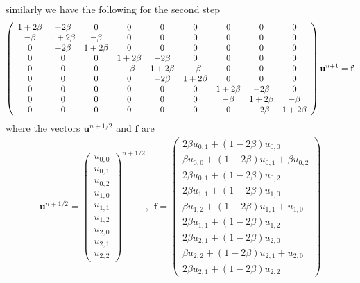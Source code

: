 similarly we have the following for the second step
\begin{align}
  \left(\begin{array}{c c c c c c c c c}
        1+2\beta & -2\beta &0 &0 &0 &0 &0 &0 &0\\
        -\beta & 1+2\beta & -\beta &0 &0 &0 &0 &0 &0\\
        0& -2\beta & 1+2\beta & 0 & 0 & 0 &0&0&0\\
        0& 0&0 & 1+2\beta & -2\beta & 0 & 0 &0&0\\
        0& 0&0&-\beta & 1+2\beta & -\beta & 0 & 0 &0\\
        0& 0&0&0&-2\beta & 1+2\beta & 0 & 0 &0\\
        0& 0 &0 &0 &0&0 & 1+2\beta & -2\beta&0\\
        0& 0 &0 &0 &0&0&-\beta & 1+2\beta &-\beta\\
         0&0 &0 &0&0 &0&0&-2\beta & 1+2\beta
       \end{array}\right)\mathbf{u}^{n+1} = \mathbf{f}
\end{align}
where the vectors $\mathbf{u}^{n+1/2}$ and $\mathbf{f}$ are 
\begin{align*}
\mathbf{u}^{n+1/2}= \left(\begin{array}{c}
                           u_{0,0}\\u_{0,1}\\u_{0,2}\\u_{1,0}\\u_{1,1}\\u_{1,2}\\u_{2,0}\\u_{2,1}\\u_{2,2}
                          \end{array}\right)^{n+1/2}\text{,}\;\;
\mathbf{f} = \left(\begin{array}{c}
                           2\beta u_{0,1} +(1-2\beta)u_{0,0}\\ \beta u_{0,0} +(1-2\beta)u_{0,1}+\beta u_{0,2}\\
                           2\beta u_{0,1} +(1-2\beta)u_{0,2}\\2\beta u_{1,1} +(1-2\beta)u_{1,0}\\
                           \beta u_{1,2} +(1-2\beta)u_{1,1}+u_{1,0}\\2\beta u_{1,1} +(1-2\beta)u_{1,2}\\
                           2\beta u_{2,1} +(1-2\beta)u_{2,0}\\ \beta u_{2,2} +(1-2\beta)u_{2,1}+u_{2,0}\\
                           2\beta u_{2,1} +(1-2\beta)u_{2,2}
                          \end{array}\right)
\end{align*}
